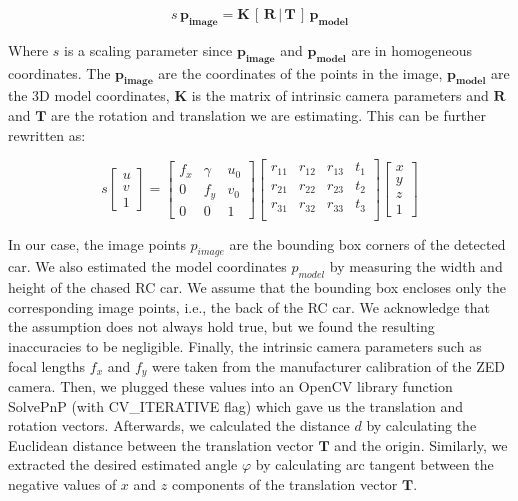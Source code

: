\documentclass{ctuthesis/ctuthesis}
\begin{document}
\begin{equation}
s\,\mathbf{p_{image}} = \mathbf{K}\,[\,\mathbf{R}\, |\, \mathbf{T}\, ]\, \mathbf{p_{model}}
\end{equation}

Where $s$ is a scaling parameter since $\mathbf{p_{image}}$ and $\mathbf{p_{model}}$ are in homogeneous coordinates. The $\mathbf{p_{image}}$ are the coordinates of the points in the image, $\mathbf{p_{model}}$ are the 3D model coordinates, $\mathbf{K}$ is the matrix of intrinsic camera parameters and $\mathbf{R}$ and $\mathbf{T}$ are the rotation and translation we are estimating. This can be further rewritten as: \par


\begin{equation}
s\begin{bmatrix}u\\v\\1\end{bmatrix} = \begin{bmatrix}
f_x & \gamma & u_0\\
0 & f_y & v_0\\
0 & 0 & 1
\end{bmatrix}\begin{bmatrix}
r_{11} & r_{12} & r_{13} & t_{1}\\
r_{21} & r_{22} & r_{23} & t_{2}\\
r_{31} & r_{32} & r_{33} & t_{3}\\
\end{bmatrix}
\begin{bmatrix}x\\y\\z\\1\end{bmatrix}
\end{equation}

In our case, the image points $p_{image}$ are the bounding box corners of the detected car. We also estimated the model coordinates $p_{model}$ by measuring the width and height of the chased RC car. We assume that the bounding box encloses only the corresponding image points, i.e., the back of the RC car. We acknowledge that the assumption does not always hold true, but we found the resulting inaccuracies to be negligible. Finally, the intrinsic camera parameters such as focal lengths $f_x$ and $f_y$ were taken from the manufacturer calibration of the ZED camera. Then, we plugged these values into an OpenCV \cite{opencv_library} library function SolvePnP (with CV\_ITERATIVE flag) which gave us the translation and rotation vectors. Afterwards, we calculated the distance $d$ by calculating the Euclidean distance between the translation vector $\mathbf{T}$ and the origin. Similarly, we extracted the desired estimated angle $\varphi$ by calculating arc tangent between the negative values of $x$ and $z$ components of the translation vector $\mathbf{T}$. \par
\end{document}
